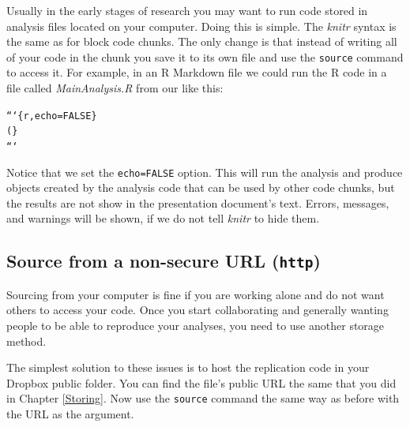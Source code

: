 Usually in the early stages of research you may want to run code stored in analysis files located on your computer. Doing this is simple. The {\emph{knitr}} syntax is the same as for block code chunks. The only change is that instead of writing all of your code in the chunk you save it to its own file and use the \texttt{source} command to access it. For example, in an R Markdown file we could run the R code in a file called {\emph{MainAnalysis.R}} from our {} like this:

\begin{knitrout}
\color{fgcolor}\begin{kframe}
\begin{alltt}
```\{r, echo=FALSE\}
(\}
```
\end{alltt}
\end{kframe}
\end{knitrout}


Notice that we set the \texttt{echo=FALSE} option. This will run the analysis and produce objects created by the analysis code that can be used by other code chunks, but the results are not show in the presentation document's text. Errors, messages, and warnings will be shown, if we do not tell {\emph{knitr}} to hide them.

\subsection{Source from a non-secure URL (\texttt{http})}

Sourcing from your computer is fine if you are working alone and do not want others to access your code. Once you start collaborating and generally wanting people to be able to reproduce your analyses, you need to
use another storage method.%

The simplest solution to these issues is to host the replication code in your Dropbox public folder. You can find the file's public URL the same that you did in Chapter \ref{Storing}. Now use the \texttt{source} command the same way as before with the URL as the argument.

